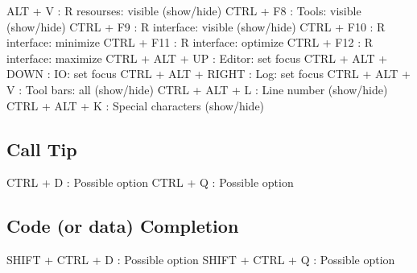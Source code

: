 \vspace{-0.5cm}
\begin{Rtables}[caption={[View menu keyboard shortcuts]
    View menu keyboard shortcuts},
  label=menu:view]
  ALT  + V                : R resourses: visible (show/hide)
  CTRL + F8               : Tools: visible (show/hide)
  CTRL + F9               : R interface: visible (show/hide)
  CTRL + F10              : R interface: minimize
  CTRL + F11              : R interface: optimize
  CTRL + F12              : R interface: maximize
  CTRL + ALT + UP         : Editor: set focus
  CTRL + ALT + DOWN       : IO: set focus
  CTRL + ALT + RIGHT      : Log: set focus
  CTRL + ALT + V          : Tool bars: all (show/hide)
  CTRL + ALT + L          : Line number (show/hide)
  CTRL + ALT + K          : Special characters (show/hide)
\end{Rtables}


\hypertarget{basic_card_calltip}{}
\subsection{Call Tip}

\vspace{-0.5cm}
\begin{Rtables}[caption={[Call tip keyboard shortcuts]
    Call tip keyboard shortcuts},
  label=shortcut:calltip]
  CTRL + D                : Possible option
  CTRL + Q                : Possible option
\end{Rtables}


\hypertarget{basic_card_codecompletion}{}
\subsection{Code (or data) Completion}

\vspace{-0.5cm}
\begin{Rtables}[caption={[Code completion keyboard shortcuts]
    Code completion keyboard shortcuts},
  label=shortcut:codecompletion]
  SHIFT + CTRL + D        : Possible option
  SHIFT + CTRL + Q        : Possible option
\end{Rtables}



